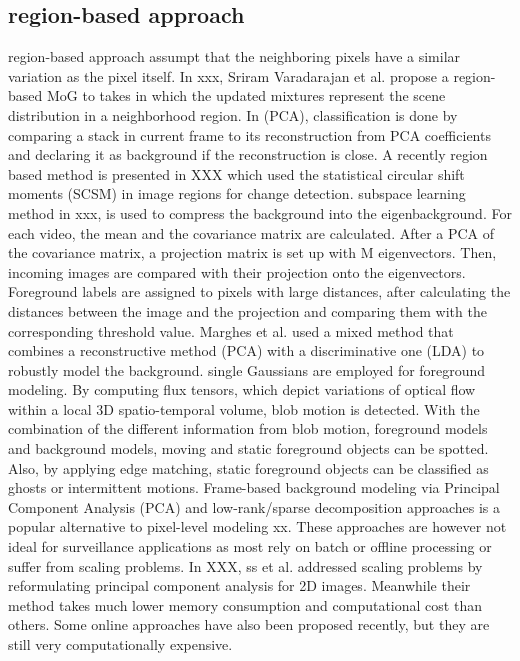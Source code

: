 \documentclass[runningheads,a4paper]{llncs}
\begin{document}
\subsection{region-based approach}
region-based approach assumpt that the neighboring pixels have a similar variation as the pixel itself. 
In xxx, Sriram Varadarajan et al. propose a region-based MoG to takes in which the updated mixtures represent the scene distribution in a neighborhood region.
In (PCA), classification is done by comparing a stack in current frame to its reconstruction from PCA coefficients and declaring it as background if the reconstruction is close.
A recently region based method is presented in XXX which used the statistical circular shift moments (SCSM) in image regions for change detection.
subspace learning method in xxx, is used to compress the background into the eigenbackground. For each video, the mean and the covariance matrix are calculated. After a PCA of the covariance matrix, a projection matrix is set up with M eigenvectors. Then, incoming images are compared with their projection onto the eigenvectors. Foreground labels are assigned to pixels with large distances, after calculating the distances between the image and the projection and comparing them with the corresponding threshold value. 
Marghes et al. used a mixed method that combines a reconstructive method (PCA) with a discriminative one (LDA) to robustly model the background.
single Gaussians are employed for foreground modeling. By computing flux tensors, which depict variations of optical flow within a local 3D spatio-temporal volume, blob motion is detected. With the combination of the different information from blob motion, foreground models and background models, moving and static foreground objects can be spotted. Also, by applying edge matching, static foreground objects can be classified as ghosts or intermittent motions.
Frame-based background modeling via Principal Component Analysis (PCA) and low-rank/sparse decomposition approaches is a popular alternative to pixel-level modeling xx. These approaches are however not ideal for surveillance applications as most rely on batch or offline processing or suffer from scaling problems. 
In XXX, ss et al. addressed scaling problems by reformulating principal component analysis for 2D images. Meanwhile their method takes much lower memory consumption and computational cost than others. Some online approaches have also been proposed recently, but they are still very computationally expensive.
\end{document}

